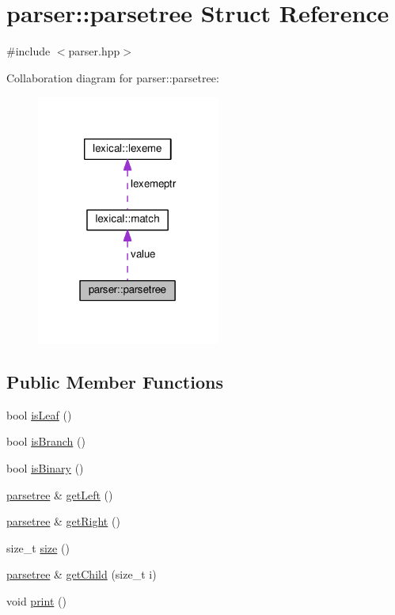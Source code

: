 \hypertarget{structparser_1_1parsetree}{}\section{parser\+:\+:parsetree Struct Reference}
\label{structparser_1_1parsetree}


{\ttfamily \#include $<$parser.\+hpp$>$}



Collaboration diagram for parser\+:\+:parsetree\+:\nopagebreak
\begin{figure}[H]
\begin{center}
\leavevmode
\includegraphics[width=171pt]{structparser_1_1parsetree__coll__graph}
\end{center}
\end{figure}
\subsection*{Public Member Functions}
\begin{DoxyCompactItemize}
\item 
bool \hyperlink{structparser_1_1parsetree_a8ba2bf7b05dd8e858edf2fab9f3d0165}{is\+Leaf} ()
\item 
bool \hyperlink{structparser_1_1parsetree_a2e876beca6bc762fa2ecb849f681f311}{is\+Branch} ()
\item 
bool \hyperlink{structparser_1_1parsetree_a460a38e7e9a33cafe00c7f7b2163f75a}{is\+Binary} ()
\item 
\hyperlink{structparser_1_1parsetree}{parsetree} \& \hyperlink{structparser_1_1parsetree_a74fd9e1633a6581f3c07a6263a686bd3}{get\+Left} ()
\item 
\hyperlink{structparser_1_1parsetree}{parsetree} \& \hyperlink{structparser_1_1parsetree_a3f158cea846ac57f787eb81a9ac2477f}{get\+Right} ()
\item 
size\+\_\+t \hyperlink{structparser_1_1parsetree_a791b5113d65303aa8d272b0eb749cb54}{size} ()
\item 
\hyperlink{structparser_1_1parsetree}{parsetree} \& \hyperlink{structparser_1_1parsetree_af238368fcc40aea999cab62ba7d74fda}{get\+Child} (size\+\_\+t i)
\item 
void \hyperlink{structparser_1_1parsetree_ada59e97da6280e95cf96cbb8f85df364}{print} ()
\end{DoxyCompactItemize}
